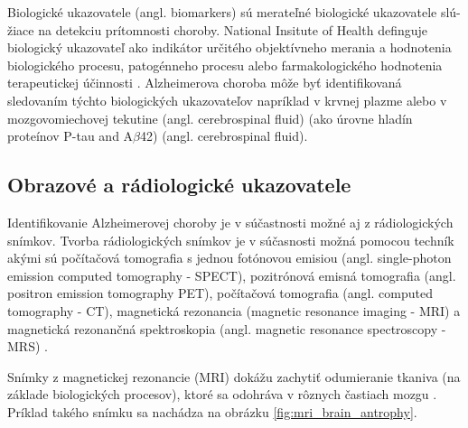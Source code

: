 Biologické ukazovatele (angl. biomarkers) sú merateľné biologické ukazovatele slú-žiace na detekciu prítomnosti choroby.
National Insitute of Health definguje biologický ukazovateľ ako indikátor určitého objektívneho merania a hodnotenia biologického procesu, patogénneho procesu alebo farmakologického hodnotenia terapeutickej účinnosti \cite{working2001biomarkers}. Alzheimerova choroba môže byť identifikovaná sledovaním týchto biologických ukazovateľov napríklad v krvnej plazme \cite{khan2016biomarkers} alebo v mozgovomiechovej tekutine (angl. cerebrospinal fluid) (ako úrovne hladín proteínov P-tau and A$\beta$42) \cite{khan2016biomarkers} (angl. cerebrospinal fluid).

\subsection{Obrazové a rádiologické ukazovatele \label{sec:neoroimaging_biomarkers}}

Identifikovanie Alzheimerovej choroby je v súčastnosti možné aj z rádiologických snímkov. Tvorba rádiologických snímkov je v súčasnosti možná pomocou techník akými sú počítačová tomografia s jednou fotónovou emisiou (angl. single-photon emission computed tomography - SPECT),
pozitrónová emisná tomografia (angl. positron emission tomography PET), počítačová tomografia (angl. computed tomography - CT), magnetická rezonancia (magnetic resonance imaging - MRI) a magnetická rezonančná spektroskopia (angl. magnetic resonance spectroscopy - MRS) \cite{khan2016biomarkers}.

Snímky z magnetickej rezonancie (MRI) dokážu zachytiť odumieranie tkaniva (na základe biologických procesov), ktoré sa odohráva v rôznych častiach mozgu \cite{khan2016biomarkers}. Príklad takého snímku sa nachádza na obrázku \ref{fig:mri_brain_antrophy}.


